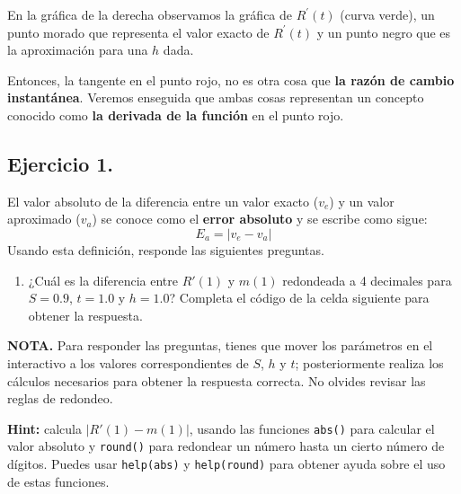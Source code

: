 \documentclass[
  letterpaper,
  DIV=11,
  numbers=noendperiod]{scrreprt}
\providecommand{\tightlist}{%
  \setlength{\itemsep}{0pt}\setlength{\parskip}{0pt}}\usepackage{longtable,booktabs,array}
\begin{document}
En la gráfica de la derecha observamos la gráfica de \(R^\prime(t)\)
(curva verde), un punto morado que representa el valor exacto de
\(R^\prime(t)\) y un punto negro que es la aproximación para una \(h\)
dada.

Entonces, la tangente en el punto rojo, no es otra cosa que \textbf{la
razón de cambio instantánea}. Veremos enseguida que ambas cosas
representan un concepto conocido como \textbf{la derivada de la función}
en el punto rojo.

\subsection{Ejercicio 1.}\label{ejercicio-1.}

El valor absoluto de la diferencia entre un valor exacto (\(v_{e}\)) y
un valor aproximado (\(v_{a}\)) se conoce como el \textbf{error
absoluto} y se escribe como sigue: \[
E_a = |v_e - v_a| \tag{4}
\] Usando esta definición, responde las siguientes preguntas.

\begin{enumerate}
\def\labelenumi{\arabic{enumi}.}
\tightlist
\item
  ¿Cuál es la diferencia entre \(R'(1)\) y \(m(1)\) redondeada a 4
  decimales para \(S = 0.9\), \(t = 1.0\) y \(h = 1.0\)? Completa el
  código de la celda siguiente para obtener la respuesta.
\end{enumerate}

\textbf{NOTA.} Para responder las preguntas, tienes que mover los
parámetros en el interactivo a los valores correspondientes de \(S\),
\(h\) y \(t\); posteriormente realiza los cálculos necesarios para
obtener la respuesta correcta. No olvides revisar las reglas de
redondeo.

\textbf{Hint:} calcula \(|R'(1) - m(1)|\), usando las funciones
\texttt{abs()} para calcular el valor absoluto y \texttt{round()} para
redondear un número hasta un cierto número de dígitos. Puedes usar
\texttt{help(abs)} y \texttt{help(round)} para obtener ayuda sobre el
uso de estas funciones.
\end{document}
